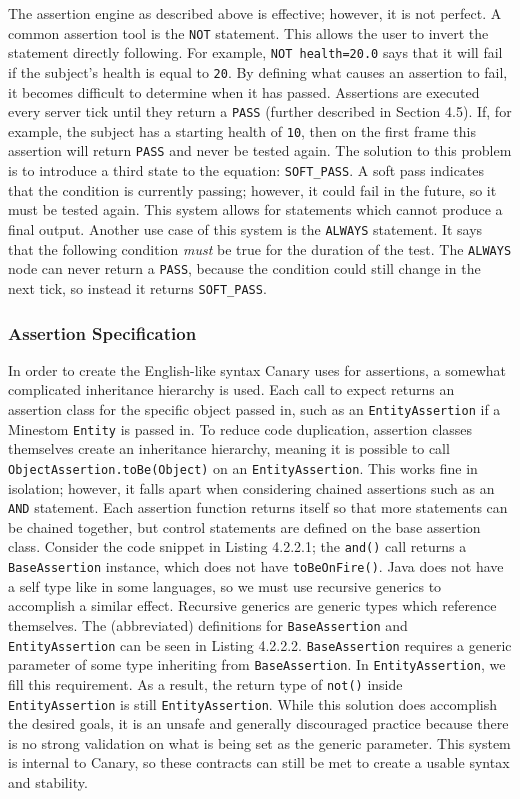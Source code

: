 \documentclass{article}
\def\code#1{\texttt{#1}}
\begin{document}
\begin{onehalfspacing}
The assertion engine as described above is effective; however, it is not
perfect. A common assertion tool is the \code{NOT} statement. This allows the
user to invert the statement directly following. For example, \code{NOT
health=20.0} says that it will fail if the subject's health is equal to
\code{20}. By defining what causes an assertion to fail, it becomes difficult
to determine when it has passed. Assertions are executed every server
tick until they return a \code{PASS} (further described in Section 4.5). If,
for example, the subject has a starting health of \code{10}, then on the first
frame this assertion will return \code{PASS} and never be tested again. The
solution to this problem is to introduce a third state to the equation:
\code{SOFT\_PASS}. A soft pass indicates that the condition is currently
passing; however, it could fail in the future, so it must be tested
again. This system allows for statements which cannot produce a final
output. Another use case of this system is the \code{ALWAYS} statement. It says
that the following condition \emph{must} be true for the duration of the
test. The \code{ALWAYS} node can never return a \code{PASS}, because the condition
could still change in the next tick, so instead it returns \code{SOFT\_PASS}.

\subsubsection{Assertion Specification}

In order to create the English-like syntax Canary uses for assertions, a
somewhat complicated inheritance hierarchy is used. Each call to expect
returns an assertion class for the specific object passed in, such as an
\code{EntityAssertion} if a Minestom \code{Entity} is passed in. To reduce code
duplication, assertion classes themselves create an inheritance
hierarchy, meaning it is possible to call \code{ObjectAssertion.toBe(Object)}
on an \code{EntityAssertion}. This works fine in isolation; however, it falls
apart when considering chained assertions such as an \code{AND} statement. Each
assertion function returns itself so that more statements can be chained
together, but control statements are defined on the base assertion
class. Consider the code snippet in Listing 4.2.2.1; the \code{and()} call
returns a \code{BaseAssertion} instance, which does not have \code{toBeOnFire()}.
Java does not have a self type like in some languages, so we must use
recursive generics to accomplish a similar effect. Recursive generics
are generic types which reference themselves. The (abbreviated)
definitions for \code{BaseAssertion} and \code{EntityAssertion} can be seen in
Listing 4.2.2.2. \code{BaseAssertion} requires a generic parameter of some type
inheriting from \code{BaseAssertion}. In \code{EntityAssertion}, we fill this
requirement. As a result, the return type of \code{not()} inside
\code{EntityAssertion} is still \code{EntityAssertion}. While this solution does
accomplish the desired goals, it is an unsafe and generally discouraged
practice because there is no strong validation on what is being set as
the generic parameter. This system is internal to Canary, so these
contracts can still be met to create a usable syntax and stability.


\end{onehalfspacing}
\end{document}
